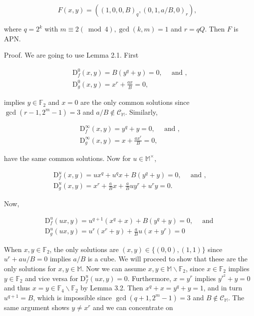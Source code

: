 \documentclass[10pt]{article}
\begin{document}
$$
F(x, y)=\left((1,0,0, B)_{q},(0,1, a / B, 0)_{r}\right),
$$

where $q=2^{k}$ with $m \equiv 2(\bmod 4), \operatorname{gcd}(k, m)=1$ and $r=q Q$. Then $F$ is APN.

Proof. We are going to use Lemma 2.1. First

$$
\begin{aligned}
& \mathrm{D}_{f}^{0}(x, y)=B\left(y^{q}+y\right)=0, \quad \text { and }, \\
& \mathrm{D}_{g}^{0}(x, y)=x^{r}+\frac{a x}{B}=0,
\end{aligned}
$$

implies $y \in \mathbb{F}_{2}$ and $x=0$ are the only common solutions since $\operatorname{gcd}\left(r-1,2^{m}-1\right)=3$ and $a / B \notin \mathcal{C}_{\mathbb{M}}$. Similarly,

$$
\begin{aligned}
& \mathrm{D}_{f}^{\infty}(x, y)=y^{q}+y=0, \quad \text { and }, \\
& \mathrm{D}_{g}^{\infty}(x, y)=x+\frac{a x^{r}}{B}=0,
\end{aligned}
$$

have the same common solutions. Now for $u \in \mathbb{M}^{\times}$,

$$
\begin{aligned}
& \mathrm{D}_{f}^{u}(x, y)=u x^{q}+u^{q} x+B\left(y^{q}+y\right)=0, \quad \text { and }, \\
& \mathrm{D}_{g}^{u}(x, y)=x^{r}+\frac{a}{B} x+\frac{a}{B} u y^{r}+u^{r} y=0 .
\end{aligned}
$$

Now,

$$
\begin{aligned}
& \mathrm{D}_{f}^{u}(u x, y)=u^{q+1}\left(x^{q}+x\right)+B\left(y^{q}+y\right)=0, \quad \text { and } \\
& \mathrm{D}_{g}^{u}(u x, y)=u^{r}\left(x^{r}+y\right)+\frac{a}{B} u\left(x+y^{r}\right)=0
\end{aligned}
$$

When $x, y \in \mathbb{F}_{2}$, the only solutions are $(x, y) \in\{(0,0),(1,1)\}$ since $u^{r}+a u / B=0$ implies $a / B$ is a cube. We will proceed to show that these are the only solutions for $x, y \in \mathbb{M}$. Now we can assume $x, y \in \mathbb{M} \backslash \mathbb{F}_{2}$, since $x \in \mathbb{F}_{2}$ implies $y \in \mathbb{F}_{2}$ and vice versa for $\mathrm{D}_{f}^{u}(u x, y)=0$. Furthermore, $x=y^{r}$ implies $y^{r^{2}}+y=0$ and thus $x=y \in \mathbb{F}_{4} \backslash \mathbb{F}_{2}$ by Lemma 3.2. Then $x^{q}+x=y^{q}+y=1$, and in turn $u^{q+1}=B$, which is impossible since $\operatorname{gcd}\left(q+1,2^{m}-1\right)=3$ and $B \notin \mathcal{C}_{\mathbb{M}}$. The same argument shows $y \neq x^{r}$ and we can concentrate on
\end{document}
